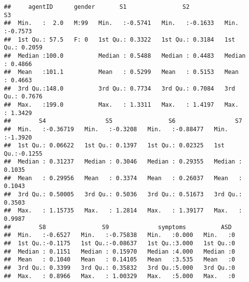 \documentclass[]{article}
\newenvironment{Shaded}{\begin{snugshade}}{\end{snugshade}}
\newcommand{\KeywordTok}[1]{\textcolor[rgb]{0.13,0.29,0.53}{\textbf{#1}}}
\newcommand{\StringTok}[1]{\textcolor[rgb]{0.31,0.60,0.02}{#1}}
\newcommand{\CommentTok}[1]{\textcolor[rgb]{0.56,0.35,0.01}{\textit{#1}}}
\newcommand{\OperatorTok}[1]{\textcolor[rgb]{0.81,0.36,0.00}{\textbf{#1}}}
\newcommand{\NormalTok}[1]{#1}
\begin{document}
\begin{verbatim}
##     agentID      gender       S1                S2                S3         
##  Min.   :  2.0   M:99   Min.   :-0.5741   Min.   :-0.1633   Min.   :-0.7573  
##  1st Qu.: 57.5   F: 0   1st Qu.: 0.3322   1st Qu.: 0.3184   1st Qu.: 0.2059  
##  Median :100.0          Median : 0.5488   Median : 0.4483   Median : 0.4866  
##  Mean   :101.1          Mean   : 0.5299   Mean   : 0.5153   Mean   : 0.4663  
##  3rd Qu.:148.0          3rd Qu.: 0.7734   3rd Qu.: 0.7084   3rd Qu.: 0.7676  
##  Max.   :199.0          Max.   : 1.3311   Max.   : 1.4197   Max.   : 1.3429  
##        S4                 S5                S6                 S7         
##  Min.   :-0.36719   Min.   :-0.3208   Min.   :-0.88477   Min.   :-1.3920  
##  1st Qu.: 0.06622   1st Qu.: 0.1397   1st Qu.: 0.02325   1st Qu.:-0.1255  
##  Median : 0.31237   Median : 0.3046   Median : 0.29355   Median : 0.1035  
##  Mean   : 0.29956   Mean   : 0.3374   Mean   : 0.26037   Mean   : 0.1043  
##  3rd Qu.: 0.50005   3rd Qu.: 0.5036   3rd Qu.: 0.51673   3rd Qu.: 0.3503  
##  Max.   : 1.15735   Max.   : 1.2814   Max.   : 1.39177   Max.   : 0.9987  
##        S8                S9              symptoms          ASD   
##  Min.   :-0.6527   Min.   :-0.75838   Min.   :0.000   Min.   :0  
##  1st Qu.:-0.1175   1st Qu.:-0.08637   1st Qu.:3.000   1st Qu.:0  
##  Median : 0.1151   Median : 0.15970   Median :4.000   Median :0  
##  Mean   : 0.1040   Mean   : 0.14105   Mean   :3.535   Mean   :0  
##  3rd Qu.: 0.3399   3rd Qu.: 0.35832   3rd Qu.:5.000   3rd Qu.:0  
##  Max.   : 0.8966   Max.   : 1.00329   Max.   :5.000   Max.   :0
\end{verbatim}

\begin{Shaded}
\end{Shaded}
\end{document}
